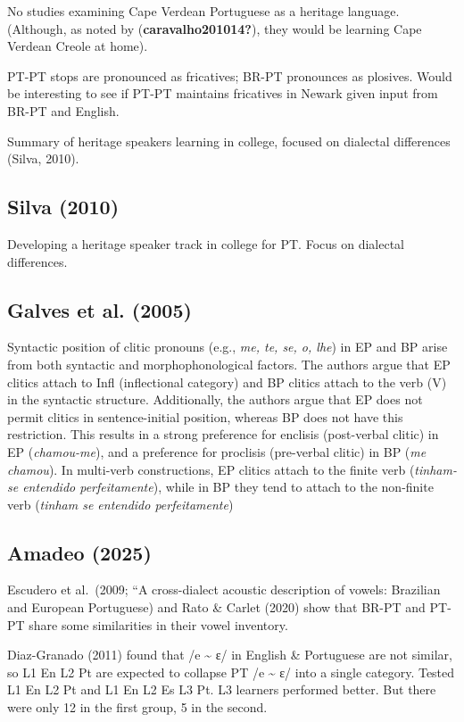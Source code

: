 \documentclass[
  letterpaper,
  DIV=11,
  numbers=noendperiod]{scrartcl}
\begin{document}
No studies examining Cape Verdean Portuguese as a heritage language.
(Although, as noted by (\textbf{caravalho201014?}), they would be
learning Cape Verdean Creole at home).

PT-PT stops are pronounced as fricatives; BR-PT pronounces as plosives.
Would be interesting to see if PT-PT maintains fricatives in Newark
given input from BR-PT and English.

Summary of heritage speakers learning in college, focused on dialectal
differences (Silva, 2010).

\subsection{Silva (2010)}\label{silva2010starting}

Developing a heritage speaker track in college for PT. Focus on
dialectal differences.

\subsection{Galves et al. (2005)}\label{galves2005syntax}

Syntactic position of clitic pronouns (e.g., \emph{me, te, se, o, lhe})
in EP and BP arise from both syntactic and morphophonological factors.
The authors argue that EP clitics attach to Infl (inflectional category)
and BP clitics attach to the verb (V) in the syntactic structure.
Additionally, the authors argue that EP does not permit clitics in
sentence-initial position, whereas BP does not have this restriction.
This results in a strong preference for enclisis (post-verbal clitic) in
EP (\emph{chamou-me}), and a preference for proclisis (pre-verbal
clitic) in BP (\emph{me chamou}). In multi-verb constructions, EP
clitics attach to the finite verb (\emph{tinham-se entendido
perfeitamente}), while in BP they tend to attach to the non-finite verb
(\emph{tinham se entendido perfeitamente})

\subsection{Amadeo (2025)}\label{amadeo2025perception}

Escudero et al.~(2009; ``A cross-dialect acoustic description of vowels:
Brazilian and European Portuguese) and Rato \& Carlet (2020) show that
BR-PT and PT-PT share some similarities in their vowel inventory.

Diaz-Granado (2011) found that /e \textasciitilde{} ɛ/ in English \&
Portuguese are not similar, so L1 En L2 Pt are expected to collapse PT
/e \textasciitilde{} ɛ/ into a single category. Tested L1 En L2 Pt and
L1 En L2 Es L3 Pt. L3 learners performed better. But there were only 12
in the first group, 5 in the second.
\end{document}
